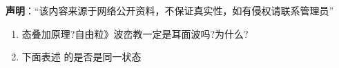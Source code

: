 
\textbf{声明}：“该内容来源于网络公开资料，不保证真实性，如有侵权请联系管理员”

\begin{enumerate}
\item  态叠加原理?自由粒》波峦教一定是耳面波吗?为什么?
\item  下面表述 的是否是同一状态
\end{enumerate}